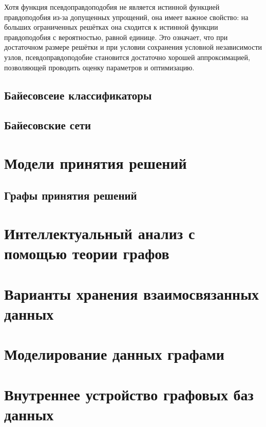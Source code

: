 Хотя функция псевдоправдоподобия не является истинной функцией правдоподобия из-за допущенных упрощений, она имеет важное свойство: на больших ограниченных решётках она сходится к истинной функции правдоподобия с вероятностью, равной единице. Это означает, что при достаточном размере решётки и при условии сохранения условной независимости узлов, псевдоправдоподобие становится достаточно хорошей аппроксимацией, позволяющей проводить оценку параметров и оптимизацию.





\subsection{Байесовсеие классификаторы}


\subsection{Байесовские сети}




\section{Модели принятия решений}



\subsection{Графы принятия решений}





\section{Интеллектуальный анализ с помощью теории графов}



\section{Варианты хранения взаимосвязанных данных}



\section{Моделирование данных графами}



\section{Внутреннее устройство графовых баз данных}






